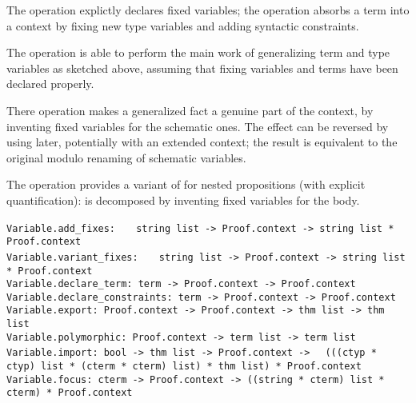 \begin{isabellebody}
\begin{isamarkuptext}
  The  operation explictly declares fixed
  variables; the  operation absorbs a term into
  a context by fixing new type variables and adding syntactic
  constraints.

  The  operation is able to perform the main work of
  generalizing term and type variables as sketched above, assuming
  that fixing variables and terms have been declared properly.

  There  operation makes a generalized fact a genuine
  part of the context, by inventing fixed variables for the schematic
  ones.  The effect can be reversed by using  later,
  potentially with an extended context; the result is equivalent to
  the original modulo renaming of schematic variables.

  The  operation provides a variant of 
  for nested propositions (with explicit quantification):  is
  decomposed by inventing fixed variables  for the body.%
\end{isamarkuptext}%
\isamarkuptrue%
%
\isadelimmlref
%
\endisadelimmlref
%
\isatagmlref
%
\begin{isamarkuptext}%
\begin{mldecls}
  \verb|Variable.add_fixes: |\isasep\isanewline%
\verb|  string list -> Proof.context -> string list * Proof.context| \\
  \verb|Variable.variant_fixes: |\isasep\isanewline%
\verb|  string list -> Proof.context -> string list * Proof.context| \\
  \verb|Variable.declare_term: term -> Proof.context -> Proof.context| \\
  \verb|Variable.declare_constraints: term -> Proof.context -> Proof.context| \\
  \verb|Variable.export: Proof.context -> Proof.context -> thm list -> thm list| \\
  \verb|Variable.polymorphic: Proof.context -> term list -> term list| \\
  \verb|Variable.import: bool -> thm list -> Proof.context ->|\isasep\isanewline%
\verb|  (((ctyp * ctyp) list * (cterm * cterm) list) * thm list) * Proof.context| \\
  \verb|Variable.focus: cterm -> Proof.context -> ((string * cterm) list * cterm) * Proof.context| \\
  \end{mldecls}


\end{isamarkuptext}
\end{isabellebody}
